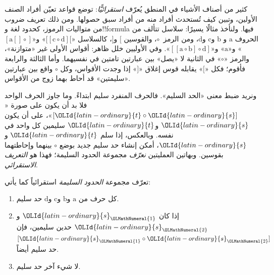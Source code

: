 \documentclass[../../../include/open-logic-section]{subfiles}
\begin{document}


كثير من أصناف الأشياء في المنطق يُعرّف \emph{استقرائيًّا}: توضع قواعد
تعيّن أفراد الصنف الأولين، وتبين كيف تُستحدث أفراد منه من أفراد سبق
حصولها. ومن ذلك تعريف ضروب من متواليات الرموز، كحدود لغة و!!{formula}
فيها. ولنأخذ مثالًا يسيرًا: سلاسل تتألف من الحروف $\mathrm{a}$ و
$\mathrm{b}$ و$\mathrm{c}$ و$\mathrm{d}$، ومن الرمز~$\circ$،
والقوسين $[$ و$]$، كالسلاسل
«$[[\mathrm{c} \circ \mathrm{d}][$» و«$[\mathrm{a}[]\circ]$»
و«$\mathrm{a}$» و«$[[\mathrm{a} \circ \mathrm{b}]\circ
\mathrm{d}]$». وفي الأوليين خلل ظاهر: أقواس الأولى غير «متوازنة»،
والرمز «$\circ$» في الثانية لا «يصل» بين عبارتين تامتين في نفسيهما.
وأما الثالثة والرابعة فأقوم؛ فكل «$[$» يقابله قوس إغلاق «$]$» إذا
وجدت الأقواس، وكل $\circ$ واقع بين عبارتين «سليمتين» قد أحاط بهما زوج
من الأقواس.

ونريد ضبط معنى «الحد السليم». فالحرف المنفرد سليم ابتداءً. وما جاوز
الحرف الواحد فلا بد أن يكون على صورة «$[{\OLId{latin-ordinary}{t}} \circ {\OLId{latin-ordinary}{s}}]$»، على أن يكون
${\OLId{latin-ordinary}{s}}$ و${\OLId{latin-ordinary}{t}}$ سليمين كل واحد في نفسه. وبالعكس، إذا سلم ${\OLId{latin-ordinary}{t}}$ و${\OLId{latin-ordinary}{s}}$، أمكن
إنشاء حد سليم جديد بوضع $\circ$ بينهما وإحاطتهما بقوسين. وبهاتين
العمليتين \emph{نعرّف} مجموعة الحدود السليمة؛ فهذا هو
\emph{التعريف الاستقرائي}.

\begin{defn}
  تعرّف مجموعة \emph{الحدود السليمة} استقرائياً كما يأتي:
  \begin{enumerate}
  \item كل حرف من $\mathrm{a}$ و$\mathrm{b}$ و$\mathrm{c}$
    و$\mathrm{d}$ حد سليم.
  \item إذا كان ${\OLId{latin-ordinary}{s}}_{\OLMathNumeral{1}}$ و${\OLId{latin-ordinary}{s}}_{\OLMathNumeral{2}}$ حدين سليمين، فإن
    $[{\OLId{latin-ordinary}{s}}_{\OLMathNumeral{1}} \circ {\OLId{latin-ordinary}{s}}_{\OLMathNumeral{2}}]$ حد سليم أيضاً.
  \item لا شيء آخر حد سليم.
  \end{enumerate}
\end{defn}
\end{document}

